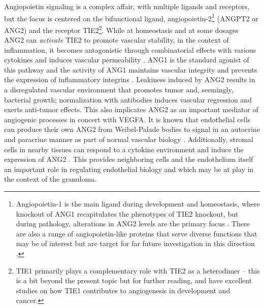 Angiopoietin signaling is a complex affair, with multiple ligands and receptors, but the focus is centered on the bifunctional ligand, angiopoietin\hyp{}2\footnote{Angiopoietin\hyp{}1 is the main ligand during development and homeostasis, where knockout of ANG1 recapitulates the phenotypes of TIE2 knockout, but during pathology, alterations in ANG2 levels are the primary focus \citep{Akwii2021}. There are also a range of angiopoietin\hyp{}like proteins that serve diverse functions that may be of interest but are target for far future investigation in this direction \citep{Hato2008}.} (ANGPT2 or ANG2) and the receptor TIE2\footnote{TIE1 primarily plays a complementary role with TIE2 as a heterodimer -- this is a bit beyond the present topic but for further reading, \citet{Savant2015} and \citet{LaPorta2018} have excellent studies on how TIE1 contributes to angiogenesis in development and cancer.}. While at homeostasis and at some dosages ANG2 can \textit{activate} TIE2 to promote vascular stability, in the context of inflammation, it becomes antagonistic through combinatorial effects with various cytokines and induces vascular permeability \citep{Augustin2009}. ANG1 is the standard agonist of this pathway and the activity of ANG1 maintains vascular integrity and prevents the expression of inflammatory integrins \citep{Augustin2009}. Leakiness induced by ANG2 results in a disregulated vascular environment that promotes tumor and, seemingly, bacterial growth; normalization with antibodies induces vascular regression and exerts anti\hyp{}tumor effects. This also implicates ANG2 as an important mediator of angiogenic processes in concert with VEGFA. It is known that endothelial cells can produce their own ANG2 from Weibel\hyp{}Palade bodies to signal in an autocrine and paracrine manner as part of normal vascular biology \citep{Fiedler2004}. Additionally, stromal cells in nearby tissues can respond to a cytokine environment and induce the expression of ANG2 \citep{Huang2010, Hato2008, Thurston2012}. This provides neighboring cells and the endothelium itself an important role in regulating endothelial biology and which may be at play in the context of the granuloma.

